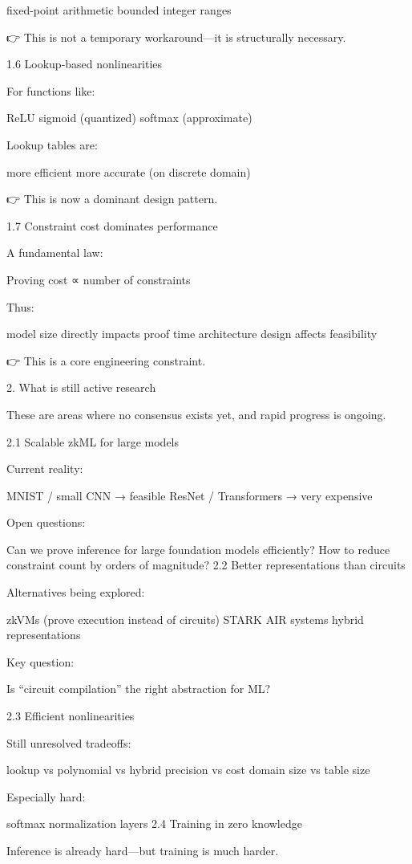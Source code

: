 fixed-point arithmetic
bounded integer ranges

👉 This is not a temporary workaround—it is structurally necessary.

1.6 Lookup-based nonlinearities

For functions like:

ReLU
sigmoid (quantized)
softmax (approximate)

Lookup tables are:

more efficient
more accurate (on discrete domain)

👉 This is now a dominant design pattern.

1.7 Constraint cost dominates performance

A fundamental law:

Proving cost ∝ number of constraints

Thus:

model size directly impacts proof time
architecture design affects feasibility

👉 This is a core engineering constraint.

2. What is still active research

These are areas where no consensus exists yet, and rapid progress is ongoing.

2.1 Scalable zkML for large models

Current reality:

MNIST / small CNN → feasible
ResNet / Transformers → very expensive

Open questions:

Can we prove inference for large foundation models efficiently?
How to reduce constraint count by orders of magnitude?
2.2 Better representations than circuits

Alternatives being explored:

zkVMs (prove execution instead of circuits)
STARK AIR systems
hybrid representations

Key question:

Is “circuit compilation” the right abstraction for ML?

2.3 Efficient nonlinearities

Still unresolved tradeoffs:

lookup vs polynomial vs hybrid
precision vs cost
domain size vs table size

Especially hard:

softmax
normalization layers
2.4 Training in zero knowledge

Inference is already hard—but training is much harder.

